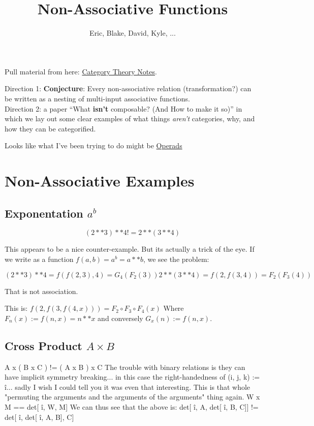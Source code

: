 \documentclass[12pt, letterpaper]{article}
\title{Non-Associative Functions}
\author{Eric, Blake, David, Kyle, ...}
\date
\begin{document}
Pull material from here: \href{https://paper.dropbox.com/doc/Category-Theory--AssmMDYM3jAU7EX1TF7_5BWvAQ-8BBmIrxmkEh3FwKEt14J6}{Category Theory Notes}.

Direction 1: {\bf Conjecture}: Every non-associative relation (transformation?) can
be written as a nesting of multi-input associative functions.\\

Direction 2: a paper ``What {\bf isn't} composable? (And How to make it so)'' in which we lay out
some clear examples of what things {\em aren't} categories, why, and how they can be categorified.

Looks like what I've been trying to do might be \href{
  http://cglab.ca/~morin/publications/ds/bloom-submitted.pdf}{
  Operads}

\section{Non-Associative Examples}

\subsection{Exponentation $a^b$}

$$(2**3)**4 != 2**(3**4)$$

This appears to be a nice counter-example.  But its actually a trick
of the eye.  If we write as a function $f(a,b) = a^b = a**b$, we see the
problem:

\begin{equation}
(2**3)**4 = f( f(2, 3), 4) = G_4( F_2(3) )
2**(3**4) = f(2, f(3, 4)) = F_2( F_3(4) )
\end{equation}

That is not association.

This is: $f(2, f(3, f(4, x))) = F_2 \circ F_3 \circ F_4(x)$ Where
$F_n(x) := f(n, x) = n**x$ and conversely $G_x(n) := f(n,x)$.

\subsection{Cross Product $A\times B$}

A x ( B x C ) != ( A x B ) x C
The trouble with binary relations is they can have implicit symmetry breaking... in this case the right-handedness of 
(i, j, k) := î... 
sadly I wish I could tell you it was even that interesting. This is that whole "permuting the arguments and the arguments of the arguments" thing again.
W x M == det[ î, W, M]
We can thus see that the above is:
det[ î, A, det[ î, B, C]] != det[ î, det[ î, A, B], C]
\end{document}
